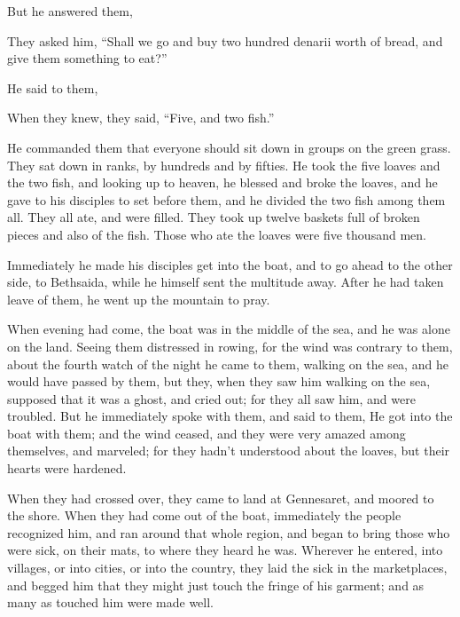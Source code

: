 {\par }{\PP {}But he answered them,
{}
\par }{\PP They asked him, “Shall we go and buy two hundred denarii worth of bread, and give them something to eat?”
\par }{\PP {}He said to them,
{}
\par }{\PP When they knew, they said, “Five, and two fish.”
\par }{\PP {}He commanded them that everyone should sit down in groups on the green grass.
They sat down in ranks, by hundreds and by fifties.
He took the five loaves and the two fish, and looking up to heaven, he blessed and broke the loaves, and he gave to his disciples to set before them, and he divided the two fish among them all.
They all ate, and were filled.
They took up twelve baskets full of broken pieces and also of the fish.
Those who ate the loaves were five thousand men.
\par }{\PP {}Immediately he made his disciples get into the boat, and to go ahead to the other side, to Bethsaida, while he himself sent the multitude away.
After he had taken leave of them, he went up the mountain to pray.
\par }{\PP {}When evening had come, the boat was in the middle of the sea, and he was alone on the land.
Seeing them distressed in rowing, for the wind was contrary to them, about the fourth watch of the night he came to them, walking on the sea,
 and he would have passed by them,
but they, when they saw him walking on the sea, supposed that it was a ghost, and cried out;
for they all saw him, and were troubled. But he immediately spoke with them, and said to them,
{}
{}
He got into the boat with them; and the wind ceased, and they were very amazed among themselves, and marveled;
for they hadn’t understood about the loaves, but their hearts were hardened.
\par }{\PP {}When they had crossed over, they came to land at Gennesaret, and moored to the shore.
When they had come out of the boat, immediately the people recognized him,
and ran around that whole region, and began to bring those who were sick, on their mats, to where they heard he was.
Wherever he entered, into villages, or into cities, or into the country, they laid the sick in the marketplaces, and begged him that they might just touch the fringe of his garment; and as many as touched him were made well.

}
